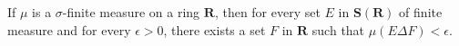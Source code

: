 If $\mu$ is a $\sigma$-finite measure on a ring $\mathbf{R}$, then for every set $E$ in $\mathbf{S}(\mathbf{R})$ of finite measure and for every $\epsilon > 0$, there exists a set $F$ in $\mathbf{R}$ such that $\mu(E \Delta F) < \epsilon$.
